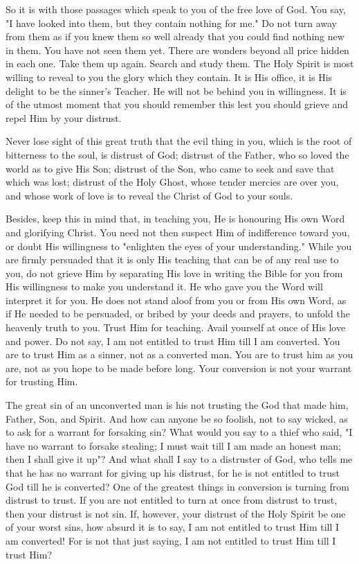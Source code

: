 \documentclass[
]{book}
\begin{document}
So it is with those passages which speak to you of the free love of God. You say, "I have looked into them, but they contain nothing for me." Do not turn away from them as if you knew them so well already that you could find nothing new in them. You have not seen them yet. There are wonders beyond all price hidden in each one. Take them up again. Search and study them. The Holy Spirit is most willing to reveal to you the glory which they contain. It is His office, it is His delight to be the sinner's Teacher. He will not be behind you in willingness. It is of the utmost moment that you should remember this lest you should grieve and repel Him by your distrust.

Never lose sight of this great truth that the evil thing in you, which is the root of bitterness to the soul, is distrust of God; distrust of the Father, who so loved the world as to give His Son; distrust of the Son, who came to seek and save that which was lost; distrust of the Holy Ghost, whose tender mercies are over you, and whose work of love is to reveal the Christ of God to your souls.

Besides, keep this in mind that, in teaching you, He is honouring His own Word and glorifying Christ. You need not then suspect Him of indifference toward you, or doubt His willingness to "enlighten the eyes of your understanding." While you are firmly persuaded that it is only His teaching that can be of any real use to you, do not grieve Him by separating His love in writing the Bible for you from His willingness to make you understand it. He who gave you the Word will interpret it for you. He does not stand aloof from you or from His own Word, as if He needed to be persuaded, or bribed by your deeds and prayers, to unfold the heavenly truth to you. Trust Him for teaching. Avail yourself at once of His love and power. Do not say, I am not entitled to trust Him till I am converted. You are to trust Him as a sinner, not as a converted man. You are to trust him as you are, not as you hope to be made before long. Your conversion is not your warrant for trusting Him.

The great sin of an unconverted man is his not trusting the God that made him, Father, Son, and Spirit. And how can anyone be so foolish, not to say wicked, as to ask for a warrant for forsaking sin? What would you say to a thief who said, "I have no warrant to forsake stealing; I must wait till I am made an honest man; then I shall give it up"? And what shall I say to a distruster of God, who tells me that he has no warrant for giving up his distrust, for he is not entitled to trust God till he is converted? One of the greatest things in conversion is turning from distrust to trust. If you are not entitled to turn at once from distrust to trust, then your distrust is not sin. If, however, your distrust of the Holy Spirit be one of your worst sins, how absurd it is to say, I am not entitled to trust Him till I am converted! For is not that just saying, I am not entitled to trust Him till I trust Him?
\end{document}
